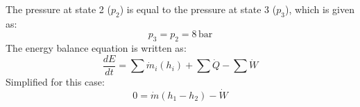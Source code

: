 The pressure at state 2 (\(p_2\)) is equal to the pressure at state 3 (\(p_3\)), which is given as:  
\[
p_3 = p_2 = 8 \, \text{bar}
\]  
The energy balance equation is written as:  
\[
\frac{dE}{dt} = \sum \dot{m}_i (h_i) + \sum \dot{Q} - \sum \dot{W}
\]  
Simplified for this case:  
\[
0 = \dot{m} (h_1 - h_2) - \dot{W}
\]